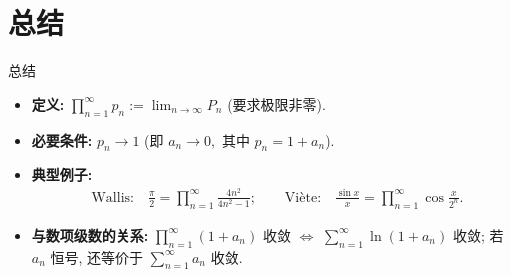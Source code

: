 
\section{总结}


\begin{frame}{总结}

\begin{itemize}
\item[{\larger[2] \color{red} \ding{43}}] \textbf{定义:} $\prod\limits_{n=1}^\infty p_n := \lim_{n\to\infty} P_n$ (要求极限\alert{非零}).

\pause
\vspace{0.8em}

\item[{\larger[2] \color{red} \ding{43}}] \textbf{必要条件:} $p_n \to 1$ (即 $a_n \to 0,$ 其中 $p_n = 1 + a_n$).

\pause
\vspace{0.8em}

\item[{\larger[2] \color{red} \ding{43}}] \textbf{典型例子:}
\begin{align*}
&\text{Wallis:} \quad \frac{\pi}{2} = \prod\limits_{n=1}^\infty \frac{4n^2}{4n^2-1}; \qquad \text{Viète:} \quad \frac{\sin x}{x} = \prod\limits_{n=1}^\infty \cos \frac{x}{2^n}.
\end{align*}

\pause
\vspace{0.4em}

\item[{\larger[2] \color{red} \ding{43}}] \textbf{与数项级数的关系:} $\prod\limits_{n=1}^\infty (1+a_n)$ 收敛 $\Longleftrightarrow$ $\sum\limits_{n=1}^\infty \ln(1+a_n)$ 收敛; 若 $a_n$ 恒号, 还等价于 $\sum\limits_{n=1}^\infty a_n$ 收敛.
\end{itemize}

\end{frame}










